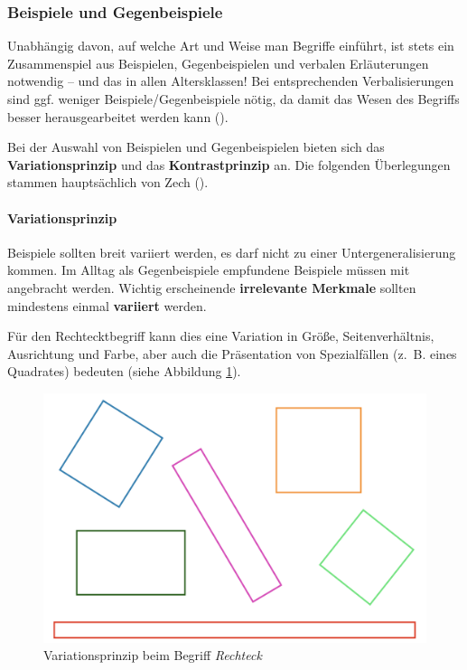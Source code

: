 \documentclass[
]{scrbook}
\theoremstyle{definition}
\theoremstyle{definition}
\theoremstyle{definition}
\theoremstyle{definition}
\theoremstyle{remark}
\begin{document}
\subsubsection{Beispiele und Gegenbeispiele}\label{beispiele-und-gegenbeispiele}

Unabhängig davon, auf welche Art und Weise man Begriffe einführt, ist stets ein Zusammenspiel aus Beispielen, Gegenbeispielen und verbalen Erläuterungen notwendig -- und das in allen Altersklassen! Bei entsprechenden Verbalisierungen sind ggf. weniger Beispiele/Gegenbeispiele nötig, da damit das Wesen des Begriffs besser herausgearbeitet werden kann ().

Bei der Auswahl von Beispielen und Gegenbeispielen bieten sich das \textbf{Variationsprinzip} und das \textbf{Kontrastprinzip} an. Die folgenden Überlegungen stammen hauptsächlich von Zech ().

\paragraph{Variationsprinzip}\label{variationsprinzip}

Beispiele sollten breit variiert werden, es darf nicht zu einer Untergeneralisierung kommen. Im Alltag als Gegenbeispiele empfundene Beispiele müssen mit angebracht werden. Wichtig erscheinende \textbf{irrelevante Merkmale} sollten mindestens einmal \textbf{variiert} werden.

Für den Rechtecktbegriff kann dies eine Variation in Größe, Seitenverhältnis, Ausrichtung und Farbe, aber auch die Präsentation von Spezialfällen (z.~B. eines Quadrates) bedeuten (siehe Abbildung \ref{fig:VariationRechteck}).



\begin{figure}

{\centering \includegraphics[width=0.75\linewidth]{pictures/7-Variation} 

}

\caption{Variationsprinzip beim Begriff \emph{Rechteck}}\label{fig:VariationRechteck}
\end{figure}
\end{document}
